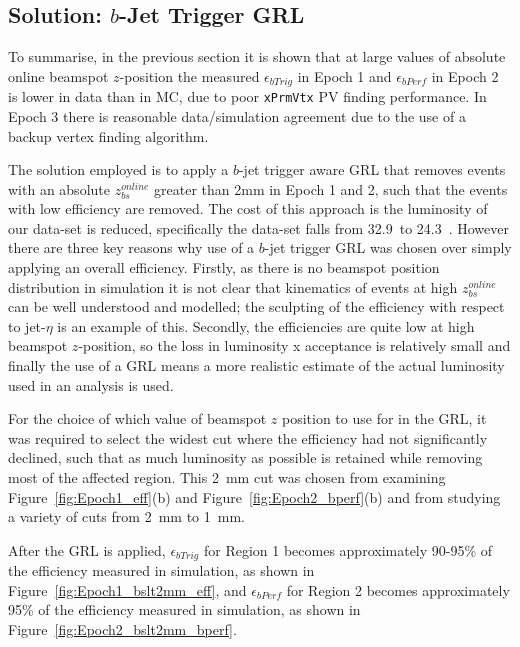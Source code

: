 \FloatBarrier

\subsection{Solution: $b$-Jet Trigger GRL}
\label{sec:trig-inv}

To summarise, in the previous section it is shown that at large values of absolute online beamspot $z$-position
the measured $\epsilon_{bTrig}$ in Epoch 1 and $\epsilon_{bPerf}$ in Epoch 2 is lower in data than in MC, due to poor \verb|xPrmVtx| PV finding performance.
In Epoch 3 there is reasonable data/simulation agreement due to the use of a backup vertex finding algorithm. 

The solution employed is to apply a $b$-jet trigger aware GRL 
that removes events with an absolute  $z_{bs}^{online}$ greater than 2mm in Epoch 1 and 2,
such that the events with low efficiency are removed.
The cost of this approach is the luminosity of our data-set is reduced, specifically the data-set falls from  32.9~\ifb to 24.3~\ifb.
However there are three key reasons why use of a $b$-jet trigger GRL was chosen over simply applying an overall efficiency.
Firstly, as there is no beamspot position distribution in simulation it is not clear that kinematics of events at high  $z_{bs}^{online}$ can be well understood and modelled;
the sculpting of the efficiency with respect to jet-$\eta$ is an example of this.
Secondly, the efficiencies are quite low at high beamspot $z$-position,
so the loss in luminosity x acceptance is relatively small
and finally the use of a GRL means a more realistic estimate of the actual luminosity used in an analysis is used. 

For the choice of which value of beamspot $z$ position to use for in the GRL,
it was required to select the widest cut where the efficiency had not significantly declined,
such that as much luminosity as possible is retained while removing most of the affected region.
This \SI{2}{\mm} cut was chosen from examining Figure~\ref{fig:Epoch1_eff}(b) and Figure~\ref{fig:Epoch2_bperf}(b)
and from studying a variety of cuts from \SI{2}{\mm} to \SI{1}{\mm}.

After the GRL is applied, $\epsilon_{bTrig}$ for Region 1 becomes approximately 90-95\% of the efficiency measured in simulation,
as shown in Figure~\ref{fig:Epoch1_bslt2mm_eff},
and $\epsilon_{bPerf}$ for Region 2 becomes approximately 95\% of the efficiency measured in simulation,
as shown in Figure~\ref{fig:Epoch2_bslt2mm_bperf}. 

